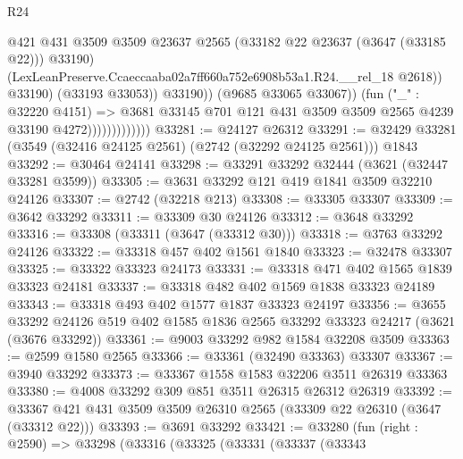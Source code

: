 \begin{lexlean}{R24}
\begin{coremodule}
                                          @421
                                          @431
                                          @3509
                                          @3509
                                          @23637
                                          @2565
                                          (@33182 @22 @23637 (@3647 (@33185 @22)))
                                          @33190)
                                        (LexLeanPreserve.Ccaeccaaba02a7ff660a752e6908b53a1.R24.__rel_18
                                          @2618))
                                      @33190)
                                    (@33193 @33053))
                                  @33190))
                              (@9685 @33065 @33067))
                            (fun ("_" : @32220 @4151) =>
                            @3681
                              @33145
                              @701
                              @121
                              @431
                              @3509
                              @3509
                              @2565
                              @4239
                              @33190
                              @4272)))))))))))))
@33281 := @24127 @26312
@33291 := @32429 @33281 (@3549 (@32416 @24125 @2561) (@2742 (@32292 @24125 @2561))) @1843
@33292 := @30464 @24141
@33298 := @33291 @33292 @32444 (@3621 (@32447 @33281 @3599))
@33305 := @3631 @33292 @121 @419 @1841 @3509 @32210 @24126
@33307 := @2742 (@32218 @213)
@33308 := @33305 @33307
@33309 := @3642 @33292
@33311 := @33309 @30 @24126
@33312 := @3648 @33292
@33316 := @33308 (@33311 (@3647 (@33312 @30)))
@33318 := @3763 @33292 @24126
@33322 := @33318 @457 @402 @1561 @1840
@33323 := @32478 @33307
@33325 := @33322 @33323 @24173
@33331 := @33318 @471 @402 @1565 @1839 @33323 @24181
@33337 := @33318 @482 @402 @1569 @1838 @33323 @24189
@33343 := @33318 @493 @402 @1577 @1837 @33323 @24197
@33356 := @3655
    @33292
    @24126
    @519
    @402
    @1585
    @1836
    @2565
    @33292
    @33323
    @24217
    (@3621 (@3676 @33292))
@33361 := @9003 @33292 @982 @1584 @32208 @3509
@33363 := @2599 @1580 @2565
@33366 := @33361 (@32490 @33363) @33307
@33367 := @3940 @33292
@33373 := @33367 @1558 @1583 @32206 @3511 @26319 @33363
@33380 := @4008 @33292 @309 @851 @3511 @26315 @26312 @26319
@33392 := @33367 @421 @431 @3509 @3509 @26310 @2565 (@33309 @22 @26310 (@3647 (@33312 @22)))
@33393 := @3691 @33292
@33421 := @33280
    (fun (right : @2590) =>
    @33298
      (@33316
        (@33325
          (@33331
            (@33337
              (@33343

\end{coremodule}
\end{lexlean}
